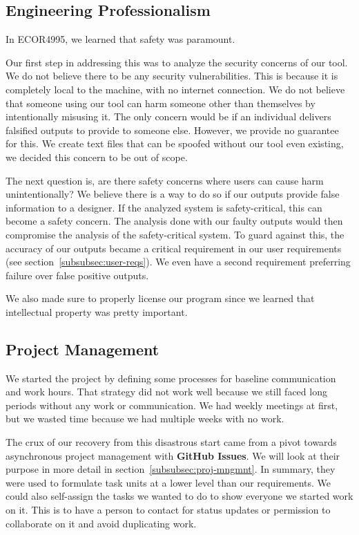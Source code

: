 
\subsection{Engineering Professionalism}\label{subsec:engineering-professionalism}
In ECOR4995, we learned that safety was paramount.

Our first step in addressing this was to analyze the security concerns of our tool.
We do not believe there to be any security vulnerabilities.
This is because it is completely local to the machine, with no internet connection.
We do not believe that someone using our tool can harm someone other than themselves by intentionally misusing it.
The only concern would be if an individual delivers falsified outputs to provide to someone else.
However, we provide no guarantee for this.
We create text files that can be spoofed without our tool even existing, we decided this concern to be out of scope.

The next question is, are there safety concerns where users can cause harm unintentionally?
We believe there is a way to do so if our outputs provide false information to a designer.
If the analyzed system is safety-critical, this can become a safety concern.
The analysis done with our faulty outputs would then compromise the analysis of the safety-critical system.
To guard against this, the accuracy of our outputs became a critical requirement in our user requirements (see section~\ref{subsubsec:user-reqs}).
We even have a second requirement preferring failure over false positive outputs.

We also made sure to properly license our program since we learned that intellectual property was pretty important.

\subsection{Project Management}\label{subsec:project-management}
We started the project by defining some processes for baseline communication and work hours.
That strategy did not work well because we still faced long periods without any work or communication.
We had weekly meetings at first, but we wasted time because we had multiple weeks with no work.

The crux of our recovery from this disastrous start came from a pivot towards asynchronous project management with \textbf{GitHub Issues}.
We will look at their purpose in more detail in section~\ref{subsubsec:proj-mngmnt}.
In summary, they were used to formulate task units at a lower level than our requirements.
We could also self-assign the tasks we wanted to do to show everyone we started work on it.
This is to have a person to contact for status updates or permission to collaborate on it and avoid duplicating work.

